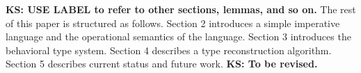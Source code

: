 \documentclass[english]{jssst_ppl} %
\theoremstyle{definition}
\newcommand\todo[1]{{\bf KS: {#1}}}
\begin{document}
\todo{USE LABEL to refer to other sections, lemmas, and so on.}  The
rest of this paper is structured as follows. Section 2 introduces a
simple imperative language and the operational semantics of the
language. Section 3 introduces the behavioral type system. Section 4
describes a type reconstruction algorithm.  Section 5 describes
current status and future work.  \todo{To be revised.}




\end{document}
